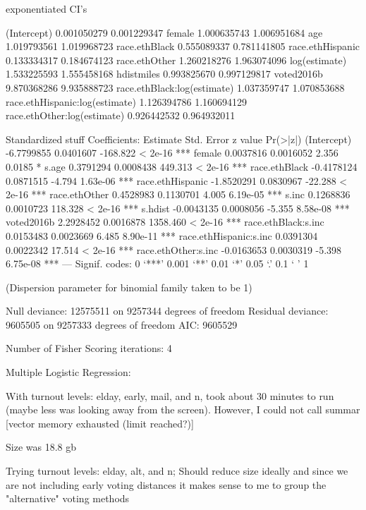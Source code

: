exponentiated CI's

(Intercept)                    0.001050279 0.001229347
female                         1.000635743 1.006951684
age                            1.019793561 1.019968723
race.ethBlack                  0.555089337 0.781141805
race.ethHispanic               0.133334317 0.184674123
race.ethOther                  1.260218276 1.963074096
log(estimate)                  1.533225593 1.555458168
hdistmiles                     0.993825670 0.997129817
voted2016b                     9.870368286 9.935888723
race.ethBlack:log(estimate)    1.037359747 1.070853688
race.ethHispanic:log(estimate) 1.126394786 1.160694129
race.ethOther:log(estimate)    0.926442532 0.964932011

Standardized stuff
Coefficients:
                         Estimate Std. Error  z value Pr(>|z|)
(Intercept)            -6.7799855  0.0401607 -168.822  < 2e-16 ***
female                  0.0037816  0.0016052    2.356   0.0185 *
s.age                   0.3791294  0.0008438  449.313  < 2e-16 ***
race.ethBlack          -0.4178124  0.0871515   -4.794 1.63e-06 ***
race.ethHispanic       -1.8520291  0.0830967  -22.288  < 2e-16 ***
race.ethOther           0.4528983  0.1130701    4.005 6.19e-05 ***
s.inc                   0.1268836  0.0010723  118.328  < 2e-16 ***
s.hdist                -0.0043135  0.0008056   -5.355 8.58e-08 ***
voted2016b              2.2928452  0.0016878 1358.460  < 2e-16 ***
race.ethBlack:s.inc     0.0153483  0.0023669    6.485 8.90e-11 ***
race.ethHispanic:s.inc  0.0391304  0.0022342   17.514  < 2e-16 ***
race.ethOther:s.inc    -0.0163653  0.0030319   -5.398 6.75e-08 ***
---
Signif. codes:  0 ‘***’ 0.001 ‘**’ 0.01 ‘*’ 0.05 ‘.’ 0.1 ‘ ’ 1

(Dispersion parameter for binomial family taken to be 1)

    Null deviance: 12575511  on 9257344  degrees of freedom
Residual deviance:  9605505  on 9257333  degrees of freedom
AIC: 9605529

Number of Fisher Scoring iterations: 4


Multiple Logistic Regression:

With turnout levels: elday, early, mail, and n,
took about 30 minutes to run (maybe less was looking away from the screen).
However, I could not call summar [vector memory exhausted (limit reached?)]

Size was 18.8 gb

Trying turnout levels: elday, alt, and n;
Should reduce size ideally and since we are not including early voting distances
it makes sense to me to group the "alternative" voting methods



